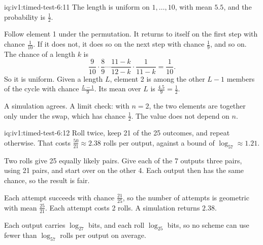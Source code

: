 \begin{solution}{iq:iv1:timed-test-6:11}
The length is uniform on $1, \dots, 10$, with mean $5.5$, and the probability is $\frac12$.

Follow element 1 under the permutation. It returns to itself on the first step with chance $\frac{1}{10}$. If it does not, it does so on the next step with chance $\frac19$, and so on. The chance of a length $k$ is
\[
\frac{9}{10} \cdot \frac89 \cdots \frac{11 - k}{12 - k} \cdot \frac{1}{11 - k} = \frac{1}{10}.
\]
So it is uniform. Given a length $L$, element 2 is among the other $L - 1$ members of the cycle with chance $\frac{L - 1}{9}$. Its mean over $L$ is $\frac{4.5}{9} = \frac12$.

A simulation agrees. A limit check: with $n = 2$, the two elements are together only under the swap, which has chance $\frac12$. The value does not depend on $n$.

\end{solution}

\begin{solution}{iq:iv1:timed-test-6:12}
Roll twice, keep 21 of the 25 outcomes, and repeat otherwise. That costs $\frac{50}{21} \approx 2.38$ rolls per output, against a bound of $\log_57 \approx 1.21$.

Two rolls give 25 equally likely pairs. Give each of the 7 outputs three pairs, using 21 pairs, and start over on the other 4. Each output then has the same chance, so the result is fair.

Each attempt succeeds with chance $\frac{21}{25}$, so the number of attempts is geometric with mean $\frac{25}{21}$. Each attempt costs 2 rolls. A simulation returns $2.38$.

Each output carries $\log_27$ bits, and each roll $\log_25$ bits, so no scheme can use fewer than $\log_57$ rolls per output on average.


\end{solution}
